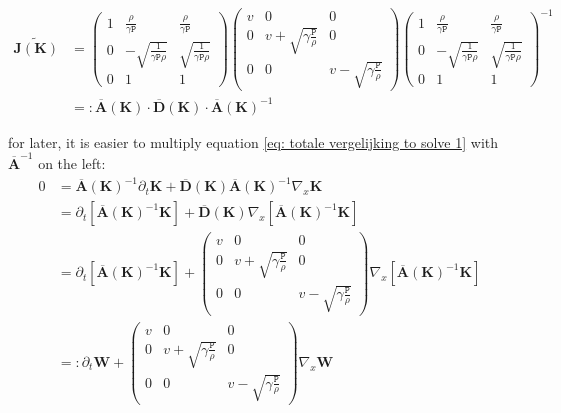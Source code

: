 \documentclass[a4paper]{article}
\begin{document}
\begin{equation*}
\begin{split}
	\widetilde{\mathbf{J(K)}} & = \left(\begin{matrix}
	1 &  \frac{\rho}{\gamma\mathtt{P}} &  \frac{\rho}{\gamma\mathtt{P}} \\
	0 &  -\sqrt{\frac{1}{\gamma\mathtt{P}\rho}} & \sqrt{\frac{1}{\gamma\mathtt{P}\rho}}\\
	0 & 1 & 1
	\end{matrix}\right) \left(\begin{matrix}
	v &  0 &  0 \\
	0 &   v + \sqrt{\gamma\frac{ \mathtt{P}}{\rho}}  & 0\\
	0 & 0 &  v - \sqrt{\gamma\frac{ \mathtt{P}}{\rho}}
	\end{matrix}\right) 
	\left(\begin{matrix}
	1 &  \frac{\rho}{\gamma\mathtt{P}} &  \frac{\rho}{\gamma\mathtt{P}} \\
	0 &  -\sqrt{\frac{1}{\gamma\mathtt{P}\rho}} & \sqrt{\frac{1}{\gamma\mathtt{P}\rho}}\\
	0 & 1 & 1
	\end{matrix}\right)^{-1}\\
	& =:  \overline{\textbf{A}}\mathbf{(K)} \cdot \overline{\textbf{D}}\mathbf{(K)}\cdot \overline{\textbf{A}}\mathbf{(K)}^{-1}
\end{split}
\end{equation*}

for later, it is easier to multiply equation \ref{eq: totale vergelijking to solve 1} with  $\overline{\textbf{A}}^{-1}$ on the left: \begin{equation}
\begin{split}
	0 &= \overline{\textbf{A}}\mathbf{(K)}^{-1} \partial_t \mathbf{K} + \overline{\textbf{D}}\mathbf{(K)} \overline{\textbf{A}}\mathbf{(K)}^{-1}  \nabla_x\mathbf{K}\\
	 & = \partial_t [\overline{\textbf{A}}\mathbf{(K)}^{-1} \mathbf{K}] + \overline{\textbf{D}}\mathbf{(K)}   \nabla_x [\overline{\textbf{A}}\mathbf{(K)}^{-1} \mathbf{K}]\\
	 & = \partial_t [\overline{\textbf{A}}\mathbf{(K)}^{-1} \mathbf{K}] +  \left(\begin{matrix}
	 v &  0 &  0 \\
	 0 &   v + \sqrt{\gamma\frac{ \mathtt{P}}{\rho}}  & 0\\
	 0 & 0 &  v - \sqrt{\gamma\frac{ \mathtt{P}}{\rho}}
	 \end{matrix}\right)   \nabla_x [\overline{\textbf{A}}\mathbf{(K)}^{-1} \mathbf{K}]\\
	 & =: \partial_t \mathbf{W} +  \left(\begin{matrix}
	 v &  0 &  0 \\
	 0 &   v + \sqrt{\gamma\frac{ \mathtt{P}}{\rho}}  & 0\\
	 0 & 0 &  v - \sqrt{\gamma\frac{ \mathtt{P}}{\rho}}
	 \end{matrix}\right)   \nabla_x \mathbf{W}
	\end{split}
\end{equation}
\end{document}
